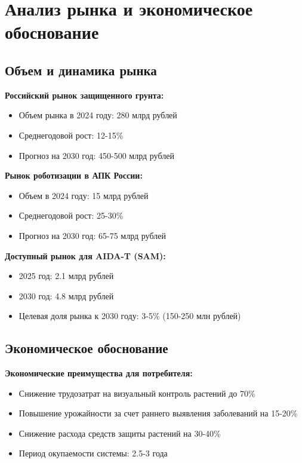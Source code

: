 \documentclass[12pt,a4paper]{article}
\begin{document}
\section{Анализ рынка и экономическое обоснование}

\subsection{Объем и динамика рынка}

\textbf{Российский рынок защищенного грунта:}
\begin{itemize}
    \item Объем рынка в 2024 году: 280 млрд рублей
    \item Среднегодовой рост: 12-15\%
    \item Прогноз на 2030 год: 450-500 млрд рублей
\end{itemize}

\textbf{Рынок роботизации в АПК России:}
\begin{itemize}
    \item Объем в 2024 году: 15 млрд рублей
    \item Среднегодовой рост: 25-30\%
    \item Прогноз на 2030 год: 65-75 млрд рублей
\end{itemize}

\textbf{Доступный рынок для AIDA-T (SAM):}
\begin{itemize}
    \item 2025 год: 2.1 млрд рублей
    \item 2030 год: 4.8 млрд рублей
    \item Целевая доля рынка к 2030 году: 3-5\% (150-250 млн рублей)
\end{itemize}

\subsection{Экономическое обоснование}

\textbf{Экономические преимущества для потребителя:}
\begin{itemize}
    \item Снижение трудозатрат на визуальный контроль растений до 70\%
    \item Повышение урожайности за счет раннего выявления заболеваний на 15-20\%
    \item Снижение расхода средств защиты растений на 30-40\%
    \item Период окупаемости системы: 2.5-3 года
\end{itemize}
\end{document}
